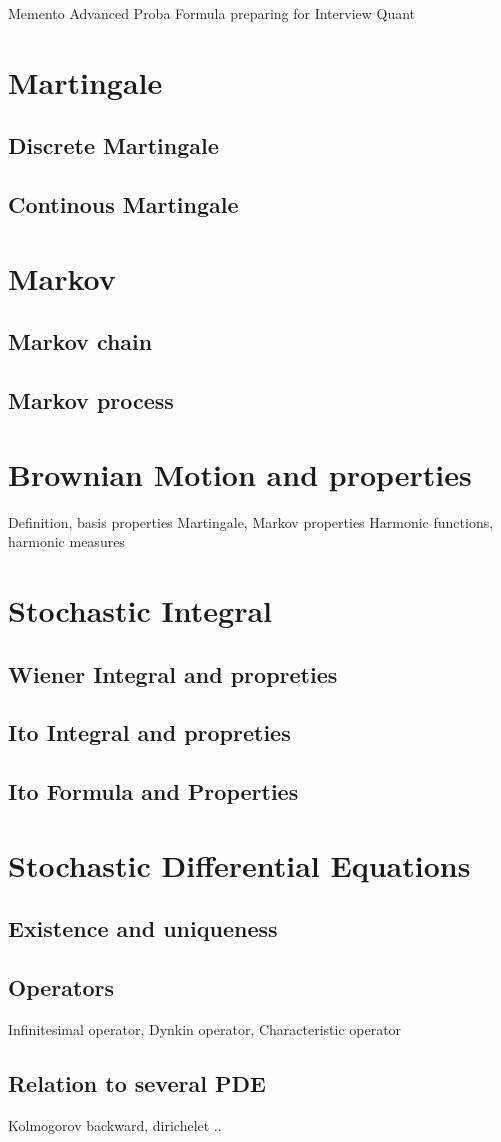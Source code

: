 \documentclass[a4paper,10pt]{article}
\begin{document}
\begin{center}Memento Advanced Proba Formula preparing for Interview Quant\end{center}
\section{Martingale}
\subsection{Discrete Martingale}
\subsection{Continous Martingale}
\section{Markov}
\subsection{Markov chain}
\subsection{Markov process}
\section{Brownian Motion and properties}
Definition, basis properties
Martingale, Markov properties
Harmonic functions, harmonic measures
\section{Stochastic Integral}
\subsection{Wiener Integral and propreties}
\subsection{Ito Integral and propreties}
\subsection{Ito Formula and Properties}
\section{Stochastic Differential Equations}
\subsection{Existence and uniqueness}
\subsection{Operators}
Infinitesimal operator, Dynkin operator, Characteristic operator
\subsection{Relation to several PDE}
Kolmogorov backward, dirichelet ..
%
%
\end{document}
